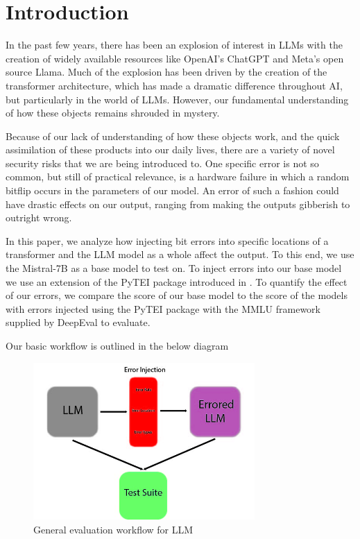 \section{Introduction}
\label{sec:intro}

In the past few years, there has been an explosion of interest in LLMs with the creation of widely available resources like OpenAI's ChatGPT
and Meta's open source Llama. Much of the explosion has been driven by the creation of the transformer architecture, which has made a dramatic difference throughout AI, but particularly in the world of LLMs. However, our fundamental understanding of how these objects remains shrouded in mystery.

Because of our lack of understanding of how these objects work, and the quick assimilation of these products into our daily lives, there are a variety of novel security risks that we are being introduced to. One specific error is not so common, but still of practical relevance, is a hardware failure in which a random bitflip occurs in the parameters of our model. An error of such a fashion could have drastic effects on our output, ranging from making the outputs gibberish to outright wrong.

In this paper, we analyze how injecting bit errors into specific locations of a transformer and the LLM model as a whole affect the output. To this end, we use the Mistral-7B \cite{jiang2023mistral7b} as a base model to test on. To inject errors into our base model we use an extension of the PyTEI package introduced in \cite{Ma23}. To quantify the effect of our errors, we compare the score of our base model to the score of the models with errors injected using the PyTEI package with the MMLU framework supplied by DeepEval to evaluate.

Our basic workflow is outlined in the below diagram

\begin{figure}[ht]
	\begin{center}
		\includegraphics[height=6cm]{images/workflow.jpg}
		\caption{General evaluation workflow for LLM}
		\label{workflow}
	\end{center}
\end{figure}






